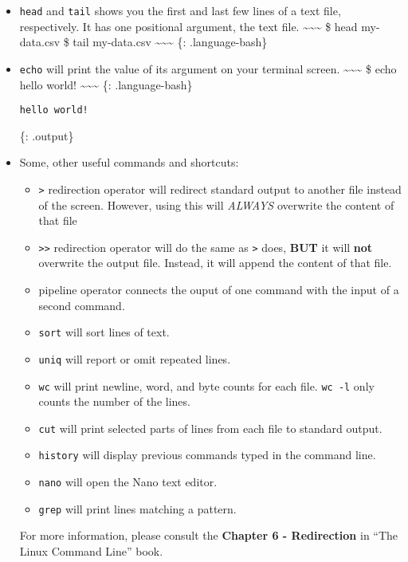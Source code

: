 \documentclass[
]{book}
\begin{document}
\begin{itemize}
\item
  \texttt{head} and \texttt{tail} shows you the first and last few lines of a text file, respectively. It has one positional argument, the text file.
  \textasciitilde\textasciitilde\textasciitilde{}
  \$ head my-data.csv
  \$ tail my-data.csv
  \textasciitilde\textasciitilde\textasciitilde{}
  \{: .language-bash\}
\item
  \texttt{echo} will print the value of its argument on your terminal screen.
  \textasciitilde\textasciitilde\textasciitilde{}
  \$ echo hello world!
  \textasciitilde\textasciitilde\textasciitilde{}
  \{: .language-bash\}

\begin{verbatim}
hello world!
\end{verbatim}

  \{: .output\}
\item
  Some, other useful commands and shortcuts:

  \begin{itemize}
  \item
    \texttt{\textgreater{}} redirection operator will redirect standard output to another file instead of the screen. However, using this will \emph{ALWAYS} overwrite the content of that file
  \item
    \texttt{\textgreater{}\textgreater{}} redirection operator will do the same as \texttt{\textgreater{}} does, \textbf{BUT} it will \textbf{not} overwrite the output file. Instead, it will append the content of that file.
  \item
    \texttt{\textbar{}} pipeline operator connects the ouput of one command with the input of a second command.
  \item
    \texttt{sort} will sort lines of text.
  \item
    \texttt{uniq} will report or omit repeated lines.
  \item
    \texttt{wc} will print newline, word, and byte counts for each file. \texttt{wc\ -l} only counts the number of the lines.
  \item
    \texttt{cut} will print selected parts of lines from each file to standard output.
  \item
    \texttt{history} will display previous commands typed in the command line.
  \item
    \texttt{nano} will open the Nano text editor.
  \item
    \texttt{grep} will print lines matching a pattern.
  \end{itemize}

  For more information, please consult the \textbf{Chapter 6 - Redirection} in ``The Linux Command Line'' book.
\end{itemize}
\end{document}
